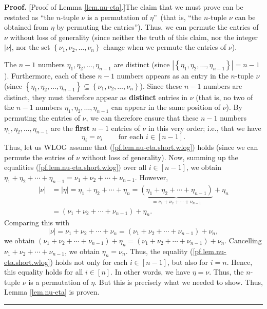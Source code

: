 \documentclass
[numbers=enddot,12pt,final,onecolumn,notitlepage,english]{scrartcl}%
\theoremstyle{definition}
\newenvironment{proof}[1][Proof]{\noindent\textbf{#1.} }{\ \rule{0.5em}{0.5em}}
\newenvironment{vershort}{}{}
\begin{document}
\begin{vershort}
\begin{proof}
[Proof of Lemma \ref{lem.nu-eta}.]The claim that we must prove can be restated
as \textquotedblleft the $n$-tuple $\nu$ is a permutation of $\eta
$\textquotedblright\ (that is, \textquotedblleft the $n$-tuple $\nu$ can be
obtained from $\eta$ by permuting the entries\textquotedblright). Thus, we can
permute the entries of $\nu$ without loss of generality (since neither the
truth of this claim, nor the integer $\left\vert \nu\right\vert $, nor the set
$\left\{  \nu_{1},\nu_{2},\ldots,\nu_{n}\right\}  $ change when we permute the
entries of $\nu$).

The $n-1$ numbers $\eta_{1},\eta_{2},\ldots,\eta_{n-1}$ are distinct (since
$\left\vert \left\{  \eta_{1},\eta_{2},\ldots,\eta_{n-1}\right\}  \right\vert
=n-1$). Furthermore, each of these $n-1$ numbers appears as an entry in the
$n$-tuple $\nu$ (since $\left\{  \eta_{1},\eta_{2},\ldots,\eta_{n-1}\right\}
\subseteq\left\{  \nu_{1},\nu_{2},\ldots,\nu_{n}\right\}  $). Since these
$n-1$ numbers are distinct, they must therefore appear as \textbf{distinct}
entries in $\nu$ (that is, no two of the $n-1$ numbers $\eta_{1},\eta
_{2},\ldots,\eta_{n-1}$ can appear in the same position of $\nu$). By
permuting the entries of $\nu$, we can therefore ensure that these $n-1$
numbers $\eta_{1},\eta_{2},\ldots,\eta_{n-1}$ are the \textbf{first }$n-1$
entries of $\nu$ in this very order; i.e., that we have%
\begin{equation}
\eta_{i}=\nu_{i}\ \ \ \ \ \ \ \ \ \ \text{for each }i\in\left[  n-1\right]  .
\label{pf.lem.nu-eta.short.wlog}%
\end{equation}
Thus, let us WLOG assume that (\ref{pf.lem.nu-eta.short.wlog}) holds (since we
can permute the entries of $\nu$ without loss of generality). Now, summing up
the equalities (\ref{pf.lem.nu-eta.short.wlog}) over all $i\in\left[
n-1\right]  $, we obtain $\eta_{1}+\eta_{2}+\cdots+\eta_{n-1}=\nu_{1}+\nu
_{2}+\cdots+\nu_{n-1}$. However,%
\begin{align*}
\left\vert \nu\right\vert  &  =\left\vert \eta\right\vert =\eta_{1}+\eta
_{2}+\cdots+\eta_{n}=\underbrace{\left(  \eta_{1}+\eta_{2}+\cdots+\eta
_{n-1}\right)  }_{=\nu_{1}+\nu_{2}+\cdots+\nu_{n-1}}+\eta_{n}\\
&  =\left(  \nu_{1}+\nu_{2}+\cdots+\nu_{n-1}\right)  +\eta_{n}.
\end{align*}
Comparing this with%
\[
\left\vert \nu\right\vert =\nu_{1}+\nu_{2}+\cdots+\nu_{n}=\left(  \nu_{1}%
+\nu_{2}+\cdots+\nu_{n-1}\right)  +\nu_{n},
\]
we obtain $\left(  \nu_{1}+\nu_{2}+\cdots+\nu_{n-1}\right)  +\eta_{n}=\left(
\nu_{1}+\nu_{2}+\cdots+\nu_{n-1}\right)  +\nu_{n}$. Cancelling $\nu_{1}%
+\nu_{2}+\cdots+\nu_{n-1}$, we obtain $\eta_{n}=\nu_{n}$. Thus, the equality
(\ref{pf.lem.nu-eta.short.wlog}) holds not only for each $i\in\left[
n-1\right]  $, but also for $i=n$. Hence, this equality holds for all
$i\in\left[  n\right]  $. In other words, we have $\eta=\nu$. Thus, the
$n$-tuple $\nu$ is a permutation of $\eta$. But this is precisely what we
needed to show. Thus, Lemma \ref{lem.nu-eta} is proven.
\end{proof}
\end{vershort}
\end{document}
